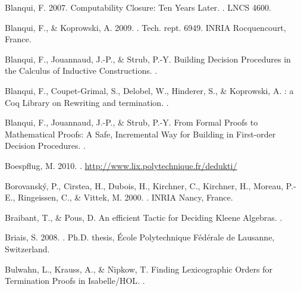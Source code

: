 \begin{thebibliography}{}
Blanqui, F. 2007.
\newblock Computability Closure: Ten Years Later.
.
\newblock LNCS 4600.

Blanqui, F., \& Koprowski, A. 2009.
.
\newblock Tech. rept. 6949. INRIA Rocquencourt, France.

Blanqui, F., Jouannaud, J.-P., \& Strub, P.-Y.
\newblock Building Decision Procedures in the Calculus of Inductive
  Constructions.
.

Blanqui, F., Coupet-Grimal, S., Delobel, W., Hinderer, S., \& Koprowski, A.
: a {Coq} {Library} on {Rewriting} and termination.
.


Blanqui, F., Jouannaud, J.-P., \& Strub, P.-Y.
\newblock From Formal Proofs to Mathematical Proofs: A Safe, Incremental Way
  for Building in First-order Decision Procedures.
.

Boespflug, M. 2010.
.
\newblock \url{http://www.lix.polytechnique.fr/dedukti/}

Borovansk{\'y}, P., Cirstea, H., Dubois, H., Kirchner, C., Kirchner, H.,
  Moreau, P.-E., Ringeissen, C., \& Vittek, M. 2000.
.
\newblock INRIA Nancy, France.


Braibant, T., \& Pous, D.
\newblock An efficient Tactic for Deciding Kleene Algebras.
.

Briais, S. 2008.
.
\newblock Ph.D. thesis, \'Ecole Polytechnique F\'ed\'erale de Lausanne,
  Switzerland.

Bulwahn, L., Krauss, A., \& Nipkow, T.
\newblock Finding Lexicographic Orders for Termination Proofs in
  {Isabelle}/{HOL}.
.


\end{thebibliography}
